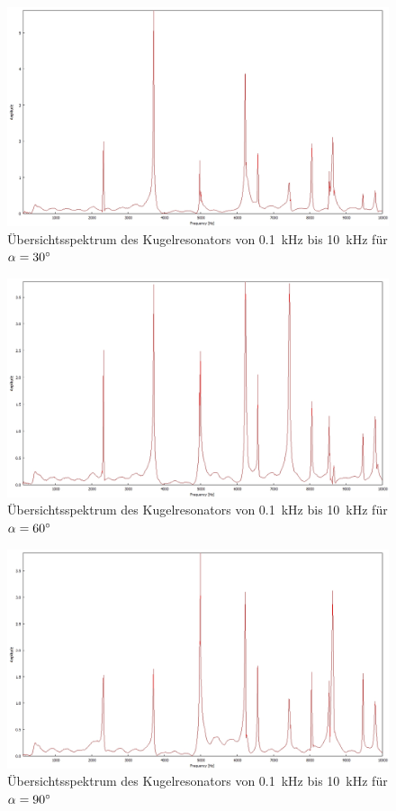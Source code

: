 \begin{figure}
\includegraphics[width=\textwidth]{content/messungen/Chapter2new/2_1_30img.jpg}
\caption{Übersichtsspektrum des Kugelresonators von 0.1~kHz bis 10~kHz für $\alpha=30\degree$}
\label{fig:2_1_30}
\end{figure}

\begin{figure}
\includegraphics[width=\textwidth]{content/messungen/Chapter2new/2_1_60img.jpg}
\caption{Übersichtsspektrum des Kugelresonators von 0.1~kHz bis 10~kHz für $\alpha=60\degree$}
\label{fig:2_1_60}
\end{figure}

\begin{figure}
\includegraphics[width=\textwidth]{content/messungen/Chapter2new/2_1_90img.jpg}
\caption{Übersichtsspektrum des Kugelresonators von 0.1~kHz bis 10~kHz für $\alpha=90\degree$}
\label{fig:2_1_90}
\end{figure}

